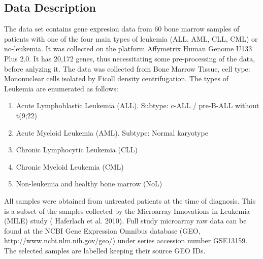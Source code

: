 \documentclass[11pt]{extarticle} %
\begin{document}
\subsection*{Data Description}
The data set contains gene expresion data from 60 bone marrow samples of patients with one of the four main types of leukemia (ALL, AML, CLL, CML) or no-leukemia. It was collected on the platform Affymetrix Human Genome U133 Plus 2.0. It has 20,172 genes, thus necessitating some pre-processing of the data, before anlyzing it. The data was collected from Bone Marrow Tissue, cell type: Mononuclear cells isolated by Ficoll density centrifugation. The types of Leukemia are enumerated as follows:
\begin{enumerate}
\item Acute Lymphoblastic Leukemia (ALL). Subtype: c-ALL / pre-B-ALL without t(9;22)
\item Acute Myeloid Leukemia (AML). Subtype: Normal karyotype
\item Chronic Lymphocytic Leukemia (CLL)
\item Chronic Myeloid Leukemia (CML)
\item Non-leukemia and healthy bone marrow (NoL)
\end{enumerate}
All samples were obtained from untreated patients at the time of diagnosis. This is a subset of the samples collected by the Microarray Innovations in Leukemia (MILE) study (\cite{Kohlmann_etal_2008_BJH} Haferlach et al. 2010). Full study microarray raw data can be found at the NCBI Gene Expression Omnibus database (GEO, http://www.ncbi.nlm.nih.gov/geo/) under series accession number GSE13159. The selected samples are labelled keeping their source GEO IDs.
\end{document}
